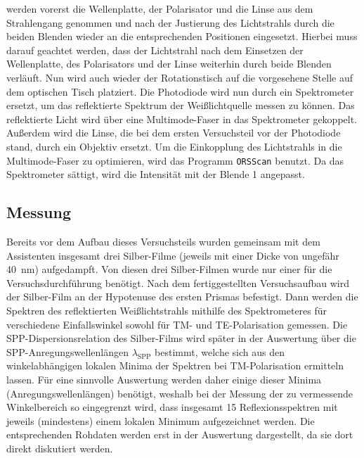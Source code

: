 werden vorerst die Wellenplatte, der Polarisator und die Linse aus dem Strahlengang genommen und nach der Justierung des Lichtstrahls durch die beiden
Blenden wieder an die entsprechenden Positionen eingesetzt. Hierbei muss darauf geachtet werden, dass der Lichtstrahl nach dem Einsetzen der Wellenplatte,
des Polarisators und der Linse weiterhin durch beide Blenden verläuft. Nun wird auch wieder der Rotationstisch auf die vorgesehene Stelle auf dem optischen
Tisch platziert. Die Photodiode wird nun durch ein Spektrometer ersetzt, um das reflektierte Spektrum der Weißlichtquelle messen zu können.
Das reflektierte Licht wird über eine Multimode-Faser in das Spektrometer gekoppelt. Außerdem wird die Linse, die bei dem ersten Versuchsteil vor der Photodiode stand,
durch ein Objektiv ersetzt. Um die Einkopplung des Lichtstrahls in die Multimode-Faser zu optimieren, wird das Programm \texttt{ORSScan} benutzt. Da
das Spektrometer sättigt, wird die Intensität mit der Blende 1 angepasst.
\subsection{Messung}\label{subsec:teil2_messung}
Bereits vor dem Aufbau dieses Versuchsteils wurden gemeinsam mit dem Assistenten insgesamt drei Silber-Filme (jeweils mit einer Dicke von ungefähr \SI{40}{\nm}) aufgedampft. Von diesen drei Silber-Filmen wurde
nur einer für die Versuchsdurchführung benötigt. Nach dem fertiggestellten Versuchsaufbau wird der Silber-Film an der Hypotenuse des ersten Prismas befestigt.
Dann werden die Spektren des reflektierten Weißlichtstrahls mithilfe des Spektrometeres für verschiedene Einfallswinkel sowohl für TM- und TE-Polarisation gemessen.
Die SPP-Dispersionsrelation des Silber-Films wird später in der Auswertung über die SPP-Anregungswellenlängen $\lambda_{\mathrm{SPP}}$ bestimmt, welche sich
aus den winkelabhängigen lokalen Minima der Spektren bei TM-Polarisation ermitteln lassen. Für eine sinnvolle Auswertung werden daher einige dieser Minima (Anregungswellenlängen) benötigt,
weshalb bei der Messung der zu vermessende Winkelbereich so eingegrenzt wird, dass insgesamt 15 Reflexionsspektren mit jeweils (mindestens) einem lokalen Minimum aufgezeichnet werden.
Die entsprechenden Rohdaten werden erst in der Auswertung dargestellt, da sie dort direkt diskutiert werden.
